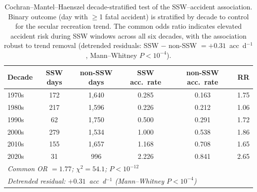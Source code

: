 \documentclass[11pt,letterpaper]{article}
\begin{document}
\clearpage
\begin{table}[htbp]
\caption{Cochran--Mantel--Haenszel decade-stratified test of the SSW--accident association. Binary outcome (day with $\geq$1 fatal accident) is stratified by decade to control for the secular recreation trend. The common odds ratio indicates elevated accident risk during SSW windows across all six decades, with the association robust to trend removal (detrended residuals: SSW $-$ non-SSW $= +0.31$~acc~d$^{-1}$, Mann--Whitney $P < 10^{-4}$).}
\label{tab:cmh_detrending}
\small
\begin{tabular}{lccccc}
\toprule
Decade & SSW days & non-SSW days & SSW acc.\ rate & non-SSW acc.\ rate & RR \\
\midrule
1970s & 172 & 1,640 & 0.285 & 0.163 & 1.75 \\
1980s & 217 & 1,596 & 0.226 & 0.212 & 1.06 \\
1990s & 62 & 1,750 & 0.500 & 0.291 & 1.72 \\
2000s & 279 & 1,534 & 1.000 & 0.538 & 1.86 \\
2010s & 155 & 1,657 & 1.168 & 0.708 & 1.65 \\
2020s & 31 & 996 & 2.226 & 0.841 & 2.65 \\
\midrule
\multicolumn{6}{l}{\textit{Common OR $= 1.77$; $\chi^2 = 54.1$; $P < 10^{-12}$}} \\
\multicolumn{6}{l}{\textit{Detrended residual: $+0.31$~acc~d$^{-1}$ (Mann--Whitney $P < 10^{-4}$)}} \\
\bottomrule
\end{tabular}
\end{table}
\end{document}
